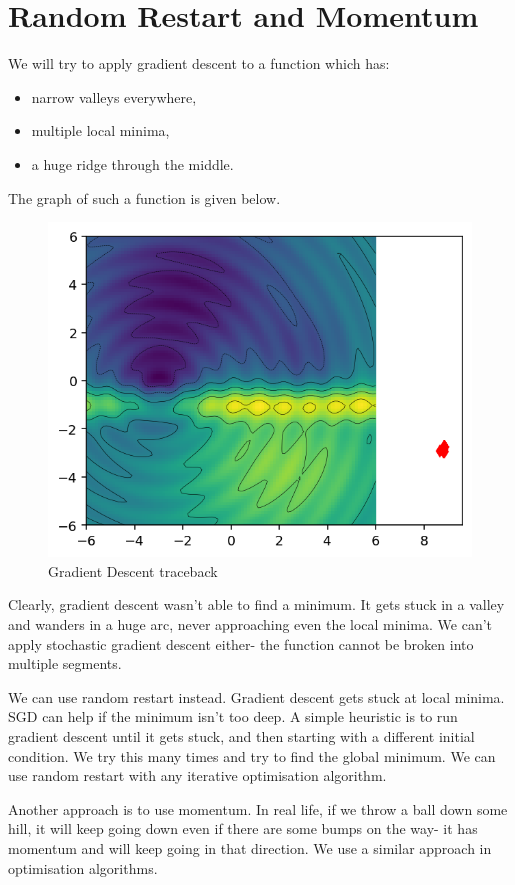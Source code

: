 \documentclass[a4paper, openany]{memoir}
\begin{document}
\section{Random Restart and Momentum}
We will try to apply gradient descent to a function which has:
\begin{itemize}
    \item narrow valleys everywhere,
    \item multiple local minima,
    \item a huge ridge through the middle.
\end{itemize}
The graph of such a function is given below.
\begin{figure}[H]
    \centering
    \includegraphics[scale=0.8]{src/4.32 gradient descent horrible function.png}
    \caption{Gradient Descent traceback}
\end{figure}
\noindent Clearly, gradient descent wasn't able to find a minimum. It gets stuck in a valley and wanders in a huge arc, never approaching even the local minima. We can't apply stochastic gradient descent either- the function cannot be broken into multiple segments.

We can use random restart instead. Gradient descent gets stuck at local minima. SGD can help if the minimum isn't too deep. A simple heuristic is to run gradient descent until it gets stuck, and then starting with a different initial condition. We try this many times and try to find the global minimum. We can use random restart with any iterative optimisation algorithm.

Another approach is to use momentum. In real life, if we throw a ball down some hill, it will keep going down even if there are some bumps on the way- it has momentum and will keep going in that direction. We use a similar approach in optimisation algorithms.
\end{document}
